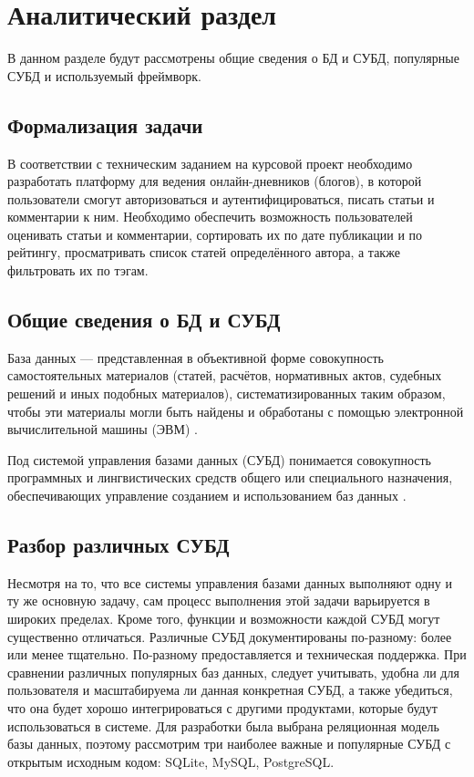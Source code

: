 \chapter{Аналитический раздел}

В данном разделе будут рассмотрены общие сведения о БД и СУБД, популярные СУБД и используемый фреймворк.

\section{Формализация задачи}

В соответствии с техническим заданием на курсовой проект необходимо разработать платформу для ведения онлайн-дневников (блогов), в которой пользователи смогут авторизоваться и аутентифицироваться, писать статьи и комментарии к ним.
Необходимо обеспечить возможность пользователей оценивать статьи и комментарии, сортировать их по дате публикации и по рейтингу, просматривать список статей определённого автора, а также фильтровать их по тэгам.

\section{Общие сведения о БД и СУБД}

База данных — представленная в объективной форме совокупность самостоятельных материалов (статей, расчётов, нормативных актов, судебных решений и иных подобных материалов), систематизированных таким образом, чтобы эти материалы могли быть найдены и обработаны с помощью электронной вычислительной машины (ЭВМ) \cite{civil}.

Под системой управления базами данных (СУБД) понимается совокупность программных и лингвистических средств общего или специального назначения, обеспечивающих управление созданием и использованием баз данных \cite{gost2007}.

\section{Разбор различных СУБД}

Несмотря на то, что все системы управления базами данных выполняют одну и ту же основную задачу, сам процесс выполнения этой задачи варьируется в широких пределах.
Кроме того, функции и возможности каждой СУБД могут существенно отличаться.
Различные СУБД документированы по-разному: более или менее тщательно.
По-разному предоставляется и техническая поддержка.
При сравнении различных популярных баз данных, следует учитывать, удобна ли для пользователя и масштабируема ли данная конкретная СУБД, а также убедиться, что она будет хорошо интегрироваться с другими продуктами, которые будут использоваться в системе.
Для разработки была выбрана реляционная модель базы данных, поэтому рассмотрим три наиболее важные и популярные СУБД с открытым исходным кодом: SQLite, MySQL, PostgreSQL.

